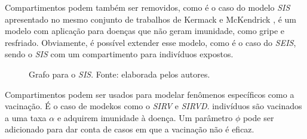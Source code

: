 Compartimentos podem também ser removidos, como é o caso do modelo \textit{SIS}
apresentado no mesmo conjunto de trabalhos de Kermack e McKendrick 
\cite{kermack-mcKendrick-pt2:1932}, é um modelo com aplicação para doenças que 
não geram imunidade, como gripe e resfriado.  
Obviamente, é possível extender esse modelo, como é o caso do \textit{SEIS}, sendo
o \textit{SIS} com um compartimento para indivíduos expostos. 

\begin{figure}
\centering
{}
\caption{Grafo para o \textit{SIS}. Fonte: elaborada pelos autores.}
\label{fig:sis-grafo}
\end{figure}

Compartimentos podem ser usados para modelar fenômenos específicos como a vacinação.
É o caso de modekos como o \textit{SIRV} \cite{schlickeiser-kroger:21-sirv} 
e \textit{SIRVD}. indivíduos são vacinados a uma taxa $\alpha$ e adquirem imunidade
à doença. Um parâmetro $\phi$ pode ser adicionado para dar conta de casos em que
a vacinação não é eficaz. 

